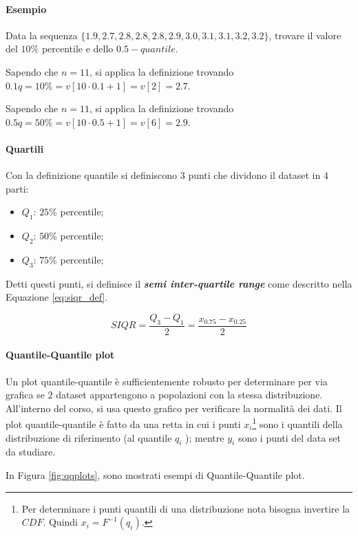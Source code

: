\documentclass{article}
\begin{document}
\paragraph{Esempio} Data la sequenza $\{1.9,2.7,2.8,2.8,2.8,2.9,3.0,3.1,3.1,3.2,3.2\}$,
trovare il valore del $10\%$ percentile e dello $0.5-quantile$.

Sapendo che $n=11$, si applica la definizione trovando $0.1q = 10\% = v[10\cdot0.1 +1] = v[2] 
= 2.7$.

Sapendo che $n=11$, si applica la definizione trovando $0.5q = 50\% = v[10\cdot0.5 +1] = v[6]
= 2.9$.

\paragraph{Quartili} Con la definizione quantile si definiscono $3$ punti che dividono il 
dataset in $4$ parti:
\begin{itemize}
  \item \textbf{$Q_1$}: $25\%$ percentile;
  \item \textbf{$Q_2$}: $50\%$ percentile;
  \item \textbf{$Q_3$}: $75\%$ percentile;
\end{itemize}

Detti questi punti, si definisce il \textbf{\textit{semi inter-quartile range}} come 
descritto nella Equazione \ref{eq:siqr_def}.

\begin{equation}
  SIQR = \frac{Q_3 - Q_1} {2} = \frac{x_{0.75} - x_{0.25}} {2}
  \label{eq:siqr_def}
\end{equation}

\paragraph{Quantile-Quantile plot} Un plot quantile-quantile è sufficientemente robusto 
per determinare per via grafica se $2$ dataset appartengono a popolazioni con la stessa 
distribuzione. All'interno del corso, si usa questo grafico per verificare la normalità dei 
dati. Il plot quantile-quantile è fatto da una retta in cui i punti $x_i$\footnote{Per 
determinare i punti quantili di una distribuzione nota bisogna invertire la $CDF$. Quindi
$x_i = F^{-1}(q_i)$.} sono i quantili della distribuzione di riferimento (al quantile $q_{i}$
); mentre $y_i$ sono i punti del data set da studiare. 

In Figura \ref{fig:qqplots}, sono mostrati esempi di Quantile-Quantile plot. 
\end{document}

